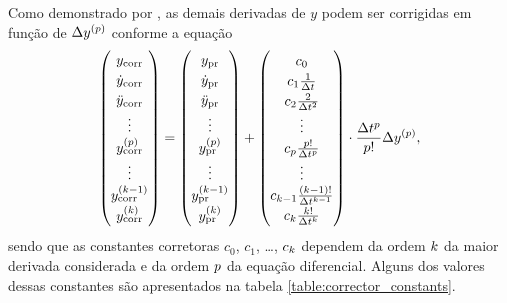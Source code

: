 Como demonstrado por , as demais derivadas de \(y\) podem ser corrigidas em função de \(\Delta \deriv{\eqOrder}{y}\) conforme a equação
\begin{equation} \label{eq:correction}
	\def\arraystretch{1.2}
	\begin{pmatrix}
		\corrected{\deriv{0}{y}} \\
		\corrected{\deriv{1}{y}} \\
		\corrected{\deriv{2}{y}} \\
		\vdots \\
		\corrected{\deriv{\eqOrder}{y}} \\
		\vdots \\
		\corrected{\deriv{\taylorOrder-1}{y}} \\
		\corrected{\deriv{\taylorOrder}{y}}
	\end{pmatrix}
	=
	\begin{pmatrix}
		\predicted{\deriv{0}{y}} \\
		\predicted{\deriv{1}{y}} \\
		\predicted{\deriv{2}{y}} \\
		\vdots \\
		\predicted{\deriv{\eqOrder}{y}} \\
		\vdots \\
		\predicted{\deriv{\taylorOrder-1}{y}} \\
		\predicted{\deriv{\taylorOrder}{y}}
	\end{pmatrix}
	+
	\begin{pmatrix}
		c_0 \\
		c_1\frac{1}{\Dt} \\
		c_2\frac{2}{\Dt^2} \\
		\vdots \\
		c_p\frac{\eqOrder!}{\Dt^\eqOrder}\\
		\vdots \\
		c_{\taylorOrder-1}\frac{\pqty{\taylorOrder-1}!}{\Dt^{\taylorOrder-1}}\\
		c_{\taylorOrder}\frac{\taylorOrder!}{\Dt^\taylorOrder}
	\end{pmatrix}
	\cdot
	\dfrac{\Dt^\eqOrder}{\eqOrder!}\Delta \deriv{\eqOrder}{y},
\end{equation}
sendo que as constantes corretoras \(c_0\), \(c_1\), \dots, \(c_{k}\) dependem da ordem \(k\) da maior derivada considerada e da ordem \(p\) da equação diferencial. Alguns dos valores dessas constantes são apresentados na tabela \ref{table:corrector_constants}.
	
